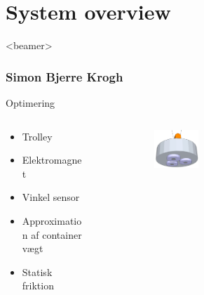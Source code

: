 \section{System overview}
\begin{frame}<beamer>
\frametitle{Simon Bjerre Krogh}
\tableofcontents[currentsection]
\end{frame}


\begin{frame}{Optimering}{}

\begin{columns}[T]
\begin{column}{.35\textwidth}

  \begin{itemize}
    \item<1-> Trolley
    \vspace{0.8cm}
    \item<2-> Elektromagnet  
    \vspace{1.5cm}
    \item<3-> Vinkel sensor
    \vspace{1cm}
    \item<4-> Approximation af container vægt 
    \vspace{0.5cm}
    \item<5-> Statisk friktion
  \end{itemize}
\end{column}%
\hfill%
\begin{column}{.65\textwidth}

\begin{figure}[H]
  \centering
{}  \begin{subfigure}{0.98\textwidth}
        \centering
        \includegraphics[width=0.3\textwidth]{Billeder/Electromagnet.png}
        \end{subfigure}



\end{figure}
\end{column}
\end{columns}
\end{frame}

